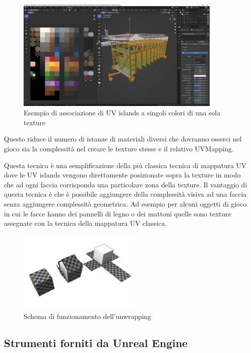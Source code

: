     \begin{figure}[!ht]
        \centering
        \includegraphics[width=10cm]{figure/BlenderLowPolyTexturing.JPG}
        \caption{Esempio di associazione di UV islands a singoli colori di una sola texture}
    \end{figure}
    
    Questo riduce il numero di istanze di materiali diversi che dovranno esserci nel gioco sia la complessità nel creare le texture stesse e il relativo UVMapping.

    Questa tecnica è una semplificazione della più classica tecnica di mappatura UV dove le UV islands vengono direttamente posizionate sopra la texture in modo che ad ogni faccia corrisponda una particolare zona della texture.
    Il vantaggio di questa tecnica è che è possibile aggiungere della complessità visiva ad una faccia senza aggiungere complessità geometrica.
    Ad esempio per alcuni oggetti di gioco in cui le facce hanno dei pannelli di legno o dei mattoni quelle sono texture assegnate con la tecnica della mappatura UV classica.

    \begin{figure}[!ht]
        \centering
        \includegraphics[width=6cm]{figure/UVUnwrapping.png}
        \caption{Schema di funzionamento dell'unwrapping \cite{UVMapsWiki}}
    \end{figure}

    \subsection{Strumenti forniti da Unreal Engine}

